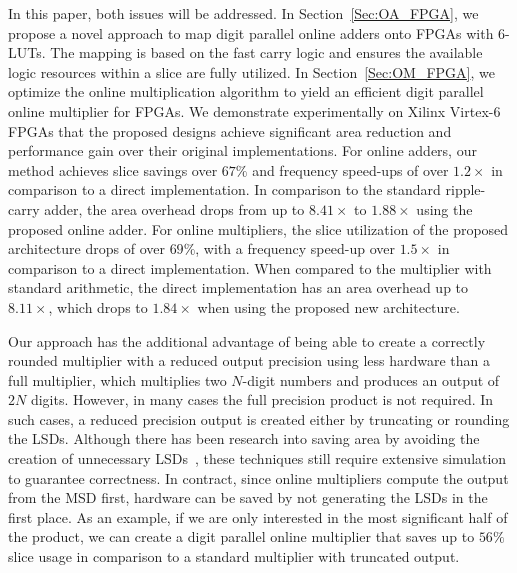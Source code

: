 \documentclass[conference]{IEEEtran}
\begin{document}
In this paper, both issues will be addressed. In Section~\ref{Sec:OA_FPGA}, we propose a novel approach to map digit parallel online adders onto FPGAs with 6-LUTs. The mapping is based on the fast carry logic and ensures the available logic resources within a slice are fully utilized. In Section~\ref{Sec:OM_FPGA}, we optimize the online multiplication algorithm to yield an efficient digit parallel online multiplier for FPGAs. We demonstrate experimentally on Xilinx Virtex-6 FPGAs that the proposed designs achieve significant area reduction and performance gain over their original implementations. For online adders, our method achieves  slice savings over $67\%$ and  frequency speed-ups of over $1.2\times$ in comparison to a direct implementation. In comparison to the standard ripple-carry adder, the area overhead drops from up to $8.41\times$ to $1.88\times$ using the proposed online adder. For online multipliers, the slice utilization of the proposed architecture drops of over $69\%$, with a frequency speed-up over $1.5\times$ in comparison to a direct implementation. When compared to the multiplier with standard arithmetic, the direct implementation has an area overhead up to $8.11\times$, which drops to $1.84\times$ when using the proposed new architecture.\vspace{-0.5ex}

Our approach has the additional advantage of being able to create a correctly rounded multiplier with a reduced output precision using less hardware than a full multiplier, which multiplies two $N$-digit numbers and produces an output of $2N$ digits. However, in many cases the full precision product is not required. In such cases, a reduced precision output is created either by truncating or rounding the LSDs. Although there has been research into saving area by avoiding the creation of unnecessary LSDs~\cite{TheoTC}, these techniques still require extensive simulation to guarantee correctness. In contract, since online multipliers compute the output from the MSD first, hardware can be saved by not generating the LSDs in the first place. As an example, if we are only interested in the most significant half of the product, we can create a digit parallel online multiplier that saves up to $56\%$ slice usage in comparison to a standard multiplier with truncated output.\vspace{-0.5ex}

\end{document}
